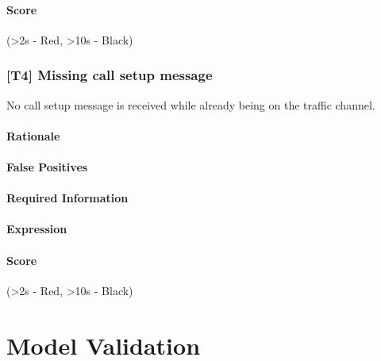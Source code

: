 \documentclass[a4paper,11pt,notitlepage,bigheadings,oneside]{scrartcl}
\begin{document}
\paragraph{Score}

\TBD{} (\textgreater 2s - Red, \textgreater 10s - Black)


\subsubsection{[T4] Missing call setup message}

No call setup message is received while already being on the traffic channel.

\paragraph{Rationale}

\TBD{}

\paragraph{False Positives}

\TBD{}

\paragraph{Required Information}

\TBD{}

\paragraph{Expression}

\TBD{}

\paragraph{Score}

\TBD{} (\textgreater 2s - Red, \textgreater 10s - Black)



\TBD{}


\section{Model Validation}
\end{document}
